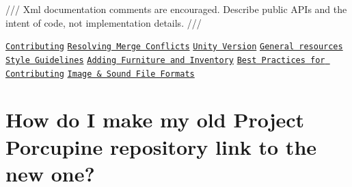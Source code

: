 /// Xml documentation comments are encouraged. Describe public A\+P\+Is and the intent of code, not implementation details. /// 

\href{#contributing}{\tt Contributing} \href{#resolving-merge-conflicts}{\tt Resolving Merge Conflicts} \href{#unity-version}{\tt Unity Version} \href{#general-resources}{\tt General resources} \href{#style-guidelines}{\tt Style Guidelines} \href{#adding-new-types-of-furniture-inventory-commands}{\tt Adding Furniture and Inventory} \href{#best-practices-for-contributing}{\tt Best Practices for Contributing} \href{#file-formats}{\tt Image \& Sound File Formats}

\section*{How do I make my old Project Porcupine repository link to the new one?}

